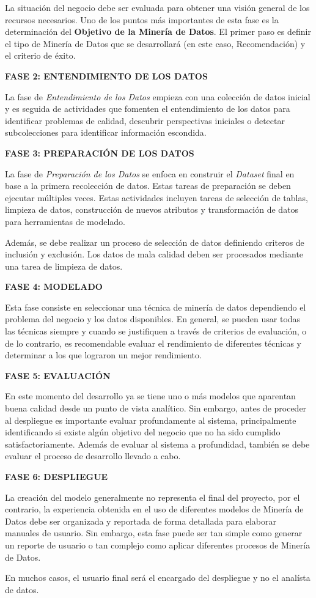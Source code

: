 La situación del negocio debe ser evaluada para obtener una visión general de los recursos necesarios. Uno de los puntos más importantes de esta fase es la determinación del \textbf{Objetivo de la Minería de Datos}. El primer paso es definir el tipo de Minería de Datos que se desarrollará (en este caso, Recomendación) y el criterio de éxito. 

\textbf{FASE 2: ENTENDIMIENTO DE LOS DATOS}

La fase de \textit{Entendimiento de los Datos} empieza con una colección de datos inicial y es seguida de actividades que fomenten el entendimiento de los datos para identificar problemas de calidad, descubrir perspectivas iniciales o detectar subcolecciones para identificar información escondida.

\textbf{FASE 3: PREPARACIÓN DE LOS DATOS}

La fase de \textit{Preparación de los Datos} se enfoca en construir el \textit{Dataset} final en base a la primera recolección de datos. Estas tareas de preparación se deben ejecutar múltiples veces. Estas actividades incluyen tareas de selección de tablas, limpieza de datos, construcción de nuevos atributos y transformación de datos para herramientas de modelado.

Además, se debe realizar un proceso de selección de datos definiendo criteros de inclusión y exclusión. Los datos de mala calidad deben ser procesados mediante una tarea de limpieza de datos.

\textbf{FASE 4: MODELADO}

Esta fase consiste en seleccionar una técnica de minería de datos dependiendo el problema del negocio y los datos disponibles. En general, se pueden usar todas las técnicas siempre y cuando se justifiquen a través de criterios de evaluación, o de lo contrario, es recomendable evaluar el rendimiento de diferentes técnicas y determinar a los que lograron un mejor rendimiento.

\textbf{FASE 5: EVALUACIÓN}

En este momento del desarrollo ya se tiene uno o más modelos que aparentan buena calidad desde un punto de vista analítico. Sin embargo, antes de proceder al despliegue es importante evaluar profundamente al sistema, principalmente identificando si existe algún objetivo del negocio que no ha sido cumplido satisfactoriamente.
Además de evaluar al sistema a profundidad, también se debe evaluar el proceso de desarrollo llevado a cabo.

\textbf{FASE 6: DESPLIEGUE}

La creación del modelo generalmente no representa el final del proyecto, por el contrario, la experiencia obtenida en el uso de diferentes modelos de Minería de Datos debe ser organizada y reportada de forma detallada para elaborar manuales de usuario. Sin embargo, esta fase puede ser tan simple como generar un reporte de usuario o tan complejo como aplicar diferentes procesos de Minería de Datos. 

En muchos casos, el usuario final será el encargado del despliegue y no el analísta de datos. 